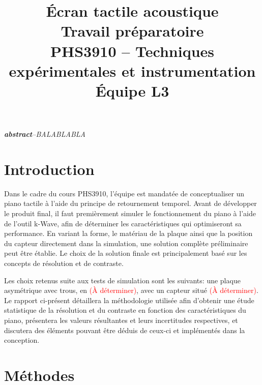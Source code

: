 \documentclass[conference]{IEEEtran}
\begin{document}
\title{Écran tactile acoustique\\
\large Travail préparatoire \\
PHS3910 -- Techniques expérimentales et instrumentation\\ 
Équipe L3}

\author{
\and
{}
\and
{}
\and
{}
}

\maketitle

\textit{\textbf{abstract}--BALABLABLA}


\section{Introduction}
Dans le cadre du cours PHS3910, l'équipe est mandatée de conceptualiser
un piano tactile à l'aide du principe de retournement temporel. Avant
de développer le produit final, il faut premièrement simuler le fonctionnement 
du piano à l'aide de l'outil k-Wave, afin de déterminer les caractéristiques qui 
optimiseront sa performance. En variant la forme, le matériau de 
la plaque ainsi que la position du capteur directement dans la simulation,
une solution complète préliminaire peut être établie. Le choix de la solution finale est
principalement basé sur les concepts de résolution et de contraste.

Les choix retenus suite aux tests de simulation sont les suivants: une plaque
asymétrique avec trous, en \textcolor{red}{(À déterminer)}, avec un capteur situé \textcolor{red}{(À déterminer)}.
Le rapport ci-présent détaillera la méthodologie utilisée afin d'obtenir 
une étude statistique de la résolution et du contraste en fonction des
caractéristiques du piano, présentera les valeurs résultantes et leurs incertitudes 
respectives, et discutera des éléments pouvant être déduis de ceux-ci et implémentés 
dans la conception.

\section{Méthodes \label{methodes}}
\end{document}
